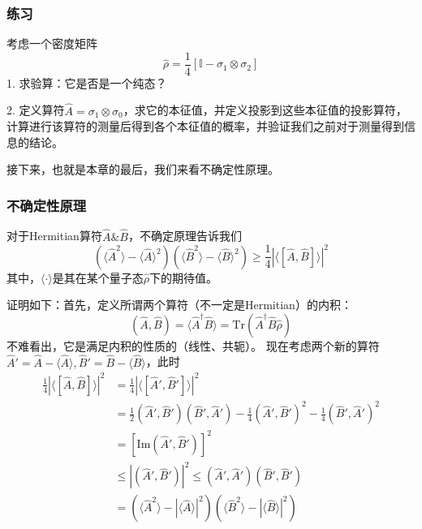 \subsubsection{练习}
考虑一个密度矩阵
\begin{equation}
\hat\rho =\frac{1}{4}[\mathbb{I}-\sigma_1\otimes\sigma_2]
\end{equation}
1. 求验算：它是否是一个纯态？

2. 定义算符$\hat A=\sigma_1\otimes\sigma_0$，求它的本征值，并定义投影到这些本征值的投影算符，计算进行该算符的测量后得到各个本征值的概率，并验证我们之前对于测量得到信息的结论。



接下来，也就是本章的最后，我们来看不确定性原理。

\subsubsection{不确定性原理}
对于Hermitian算符$\hat A\&\hat B$，不确定原理告诉我们
\begin{equation}
(\langle\hat A^2\rangle-\langle\hat A\rangle^2)(\langle\hat B^2\rangle-\langle\hat B\rangle^2)\ge\frac{1}{4}|\langle[\hat A,\hat B]\rangle|^2
\end{equation}
其中，$\langle\cdot\rangle$是其在某个量子态$\hat\rho$下的期待值。

证明如下：首先，定义所谓两个算符（不一定是Hermitian）的内积：
\begin{equation}
(\hat A, \hat B)=\langle\hat A^\dagger\hat B\rangle = \text{Tr}(\hat A^\dagger\hat B\hat\rho)
\end{equation}
不难看出，它是满足内积的性质的（线性、共轭）。
现在考虑两个新的算符$\hat A'=\hat A-\langle\hat A\rangle, \hat B'=\hat B-\langle\hat B\rangle$，此时
\begin{equation}
\begin{split}
\frac{1}{4}|\langle[\hat A,\hat B]\rangle|^2&=\frac{1}{4}|\langle[\hat A',\hat B']\rangle|^2 \\
&=\frac{1}{2}(\hat A',\hat B')(\hat B',\hat A')-\frac{1}{4}(\hat A',\hat B')^2-\frac{1}{4}(\hat B',\hat A')^2\\
&=[\text{Im}(\hat A',\hat B')]^2\\
&\le |(\hat A',\hat B')|^2\le(\hat A',\hat A')(\hat B',\hat B')\\
&=(\langle\hat A^2\rangle - |\langle\hat A\rangle|^2)(\langle\hat B^2\rangle - |\langle\hat B\rangle|^2)
\end{split}
\end{equation}

